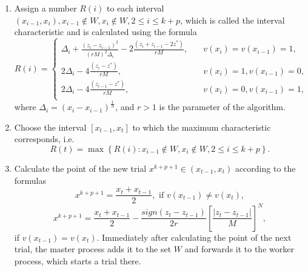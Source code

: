 \documentclass[runningheads]{llncs}
\begin{document}
\begin{enumerate}
\item Assign a number $R(i)$ to each interval $(x_{i-1}, x_i), x_{i-1} \notin W, x_i \notin W, 2 \leq i \leq k+p$, which is called the interval characteristic and is calculated using the formula
\begin{equation}\label{characteristic}
R(i)=
\begin{cases}
    \Delta_i+\frac{(z_i-z_{i-1})^2}{(rM)^2\Delta_i} - 2 \frac{(z_i+z_{i-1}-2z^*)}{rM},   & \quad v(x_i)=v(x_{i-1})=1,\\
    2\Delta_i- 4 \frac{(z_i-z^*)}{rM},   & \quad v(x_i)=1, v(x_{i-1})=0,\\
    2\Delta_i- 4 \frac{(z_{i-1}-z^*)}{rM},       & \quad v(x_i)=0, v(x_{i-1})=1,\\
\end{cases}
\end{equation}
where $\Delta_i=(x_i-x_{i-1})^\frac{1}{N}$, and $r>1$ is the parameter of the algorithm.

\item Choose the interval $[x_{t-1}, x_t]$ to which the maximum characteristic corresponds, i.e.
\[
R(t)= \max \left\{ R(i): x_{i-1} \notin W, x_i \notin W, 2 \leq i \leq k+p\right\}.
\]

\item Calculate the point of the new trial $x^{k+p+1} \in (x_{t-1}, x_t)$ according to the formulas
\begin{equation}\label{new_point_1} 
x^{k+p+1} = \frac{x_t+x_{t-1}}{2}, \text{ if } v(x_{t-1}) \neq v(x_t),
\end{equation}
\begin{equation}\label{new_point_2} 
x^{k+p+1} = \frac{x_t+x_{t-1}}{2}-\frac{\textit{sign}{(z_t-z_{t-1})}}{2r} \left[ \frac{|z_t-z_{t-1}|}{M} \right]^N,
\end{equation}
if $v(x_{t-1})=v(x_t)$.
Immediately after calculating the point of the next trial, the master process adds it to the set $W$ and forwards it to the worker process, which starts a trial there.
\end{enumerate}
\end{document}
